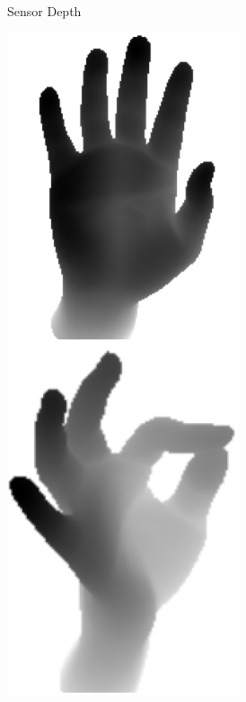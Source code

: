 \begin{figure}[ht]
\begin{subfigure}{0.25\textwidth}
                \caption{\footnotesize Sensor Depth}
        \end{subfigure}
        \begin{subfigure}{0.25\textwidth}
                \centering
                \includegraphics[width=0.75\textwidth]{figures_1_hand_tracking/Synthetic_tiled}

\end{subfigure}
\end{figure}
